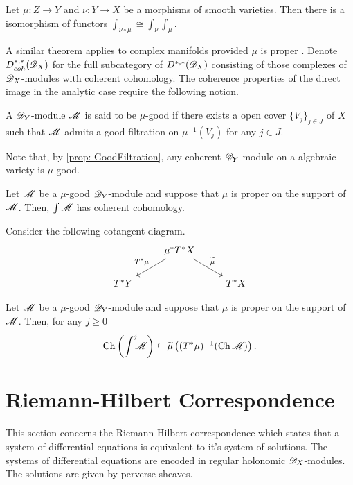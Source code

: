 \begin{proposition}{\cite[Chapter VI, Section 5]{borel1987algebraic}}
  Let $\mu:Z\to Y$ and $\nu:Y\to X$ be a morphisms of smooth varieties. Then there is a isomorphism of functors $\int_{\nu\circ \mu} \cong \int_\nu \int_\mu$.
\end{proposition}
A similar theorem applies to complex manifolds provided $\mu$ is proper \cite[Theorem 3.3.6]{sabbah2011introduction}.
Denote $D_{coh}^{*,*}(\mathscr{D}_X)$ for the full subcategory of $D^{*,*}(\mathscr{D}_X)$ consisting of those complexes of $\mathscr{D}_X$-modules with coherent cohomology.
The coherence properties of the direct image in the analytic case require the following notion.
\begin{definition}
  A $\mathscr{D}_Y$-module $\mathscr{M}$ is said to be $\mu$-good if there exists a open cover $\{V_j\}_{j\in J}$ of $X$ such that $\mathscr{M}$ admits a good filtration on $\mu^{-1}(V_j)$ for any $j\in J$.
\end{definition}
Note that, by \cref{prop: GoodFiltration}, any coherent $\mathscr{D}_Y$-module on a algebraic variety is $\mu$-good.
\begin{theorem}{\cite[Theorem 3.4.1.]{sabbah2011introduction}}\label{thm: MuGoodCoherent}
  Let $\mathscr{M}$ be a $\mu$-good $\mathscr{D}_Y$-module and suppose that $\mu$ is proper on the support of $\mathscr{M}$.
  Then, $\int \mathscr{M}$ has coherent cohomology.
\end{theorem}
Consider the following cotangent diagram.
$$
\begin{tikzcd}
    & \mu^* T^* X\arrow[swap]{ld}{T^* \mu} \arrow{rd}{\widetilde{\mu}} & \\
    T^* Y & & T^*X
\end{tikzcd}
$$
\begin{proposition}{\cite[Theorem 3.4.1.]{sabbah2011introduction}}\label{prop: EstimateProper}
  Let $\mathscr{M}$ be a $\mu$-good $\mathscr{D}_Y$-module and suppose that $\mu$ is proper on the support of $\mathscr{M}$. Then, for any $j\geq 0$
  $$\operatorname{Ch}\left(\int^j \mkern -8mu \mathscr{M} \right)\subseteq  \widetilde{\mu}\left((T^*\mu)^{-1}(\operatorname{Ch} \mathscr{M}) \right).$$
\end{proposition}
\section{Riemann-Hilbert Correspondence}\label{sec: Riemann-Hilbert}
This section concerns the Riemann-Hilbert correspondence which states that a system of differential equations is equivalent to it's system of solutions.
The systems of differential equations are encoded in regular holonomic $\mathscr{D}_X$-modules.
The solutions are given by perverse sheaves.
